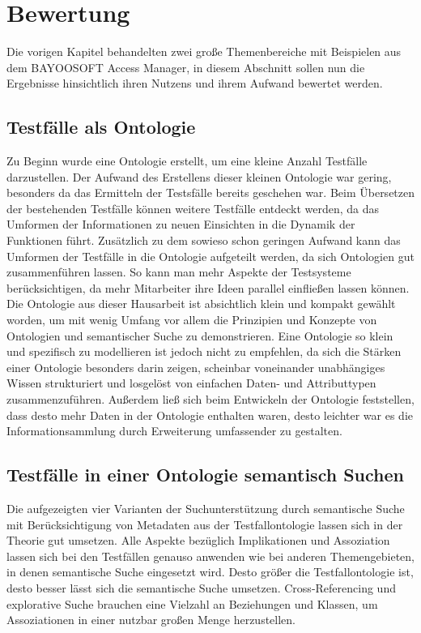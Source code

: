 \chapter{Bewertung}
Die vorigen Kapitel behandelten zwei große Themenbereiche mit Beispielen aus dem BAYOOSOFT Access Manager, in diesem Abschnitt sollen nun die Ergebnisse hinsichtlich ihren Nutzens und ihrem Aufwand bewertet werden. 
\section{Testfälle als Ontologie}
Zu Beginn wurde eine Ontologie erstellt, um eine kleine Anzahl Testfälle darzustellen. Der Aufwand des Erstellens dieser kleinen Ontologie war gering, besonders da das Ermitteln der Testsfälle bereits geschehen war. Beim \glqq Übersetzen\grqq{} der bestehenden Testfälle können weitere Testfälle entdeckt werden, da das Umformen der Informationen zu neuen Einsichten in die Dynamik der Funktionen führt. Zusätzlich zu dem sowieso schon geringen Aufwand kann das Umformen der Testfälle in die Ontologie aufgeteilt werden, da sich Ontologien gut zusammenführen lassen. So kann man mehr Aspekte der Testsysteme berücksichtigen, da mehr Mitarbeiter ihre Ideen parallel einfließen lassen können. Die Ontologie aus dieser Hausarbeit ist absichtlich klein und kompakt gewählt worden, um mit wenig Umfang vor allem die Prinzipien und Konzepte von Ontologien und semantischer Suche zu demonstrieren. Eine Ontologie so klein und spezifisch zu modellieren ist jedoch nicht zu empfehlen, da sich die Stärken einer Ontologie besonders darin zeigen, scheinbar voneinander unabhängiges Wissen strukturiert und losgelöst von einfachen Daten- und Attributtypen zusammenzuführen. Außerdem ließ sich beim Entwickeln der Ontologie feststellen, dass desto mehr Daten in der Ontologie enthalten waren, desto leichter war es die Informationsammlung durch Erweiterung umfassender zu gestalten.
\section{Testfälle in einer Ontologie semantisch Suchen}
Die aufgezeigten vier Varianten der Suchunterstützung durch semantische Suche mit Berücksichtigung von Metadaten aus der Testfallontologie lassen sich in der Theorie gut umsetzen. Alle Aspekte bezüglich Implikationen und Assoziation lassen sich bei den Testfällen genauso anwenden wie bei anderen Themengebieten, in denen semantische Suche eingesetzt wird. Desto größer die Testfallontologie ist, desto besser lässt sich die semantische Suche umsetzen. Cross-Referencing und explorative Suche brauchen eine Vielzahl an Beziehungen und Klassen, um Assoziationen in einer nutzbar großen Menge herzustellen. 
